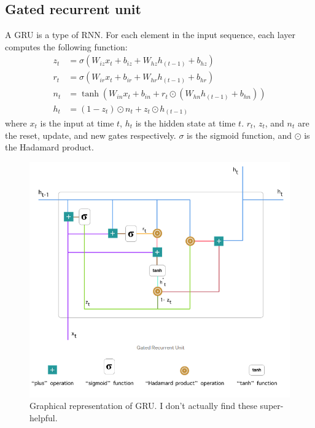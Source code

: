 \documentclass[11pt]{article}
\numberwithin{equation}{section}
\begin{document}
\subsection{Gated recurrent unit}
A GRU is a type of RNN. For each element in the input sequence, each layer computes the following function:
\begin{align}
z_t &= \sigma(W_{iz}x_t + b_{iz} + W_{hz} h_{(t-1)} + b_{hz}) \label{eq:gru_update_gate_zt} \\
r_t &= \sigma(W_{ir}x_t + b_{ir} + W_{hr}h_{(t-1)} + b_{hr}) \label{eq:gru_reset_gate_rt} \\
n_t &= \tanh(W_{in} x_t + b_{in} + r_t \odot (W_{hn} h_{(t-1)} + b_{hn}) ) \label{eq:gru_candidate_hidden_state_nt} \\
h_t &= (1-z_t) \odot n_t + z_t \odot h_{(t-1)} \label{eq:update_ht}
\end{align}
where $x_t$ is the input at time $t$, $h_t$ is the hidden state at time $t$. $r_t$, $z_t$, and $n_t$ are the reset, update, and new gates respectively. $\sigma$ is the sigmoid function, and $\odot$ is the Hadamard product.

\begin{figure}
\begin{center}
\includegraphics[width=0.8\columnwidth]{../figures/gru.png}  
\end{center}
\caption{Graphical representation of GRU. I don't actually find these super-helpful.
}
\label{fig:rnn}
\end{figure}
\end{document}

